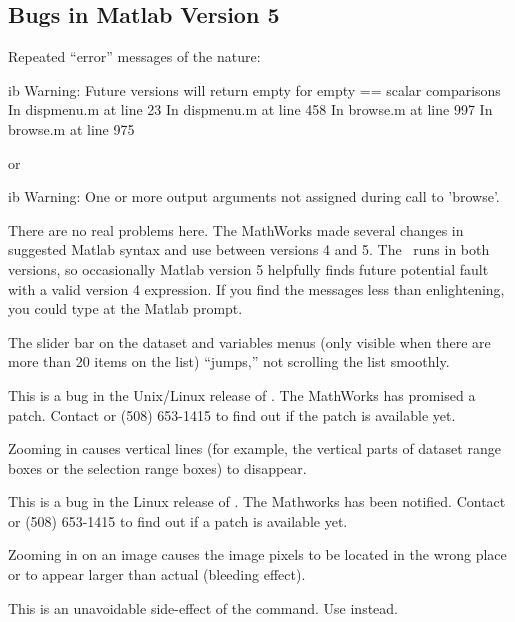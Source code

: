 \subsection{Bugs in Matlab Version 5}

\problem Repeated ``error'' messages of the nature:

\begin{vcode}{ib}
  Warning: Future versions will return empty 
       for empty == scalar comparisons
  In dispmenu.m at line 23
  In dispmenu.m at line 458
  In browse.m at line 997
  In browse.m at line 975
\end{vcode}

or

\begin{vcode}{ib}
  Warning: One or more output arguments not assigned 
       during call to 'browse'.
\end{vcode}

\fix There are no real problems here. The MathWorks made several
changes in suggested Matlab syntax and use between versions 4 and
5. The \GUI\ runs in both versions, so occasionally Matlab version 5
helpfully finds future potential fault with a valid version 4
expression.  If you find the messages less than enlightening, you
could type  at the Matlab prompt.

\problem The slider bar on the dataset and variables menus
(only visible when there are more than 20 items on the list)
``jumps,'' not scrolling the list smoothly.

\fix This is a bug in the Unix/Linux release of \mfive.
The MathWorks has promised a patch.  Contact
 or (508) 653-1415 to find out if the 
patch is available yet.

\problem Zooming in causes vertical lines (for example, 
the vertical parts of dataset range boxes or the selection range
boxes) to disappear.

\fix  This is a bug in the Linux release of \mfive.  
The Mathworks has been notified.  Contact
 or (508) 653-1415 to find 
out if a patch is available yet.

\problem Zooming in on an image causes the image pixels 
to be located in the wrong place or to appear larger than actual
(bleeding effect).

\fix This is an unavoidable side-effect of the 
command. Use  instead.


